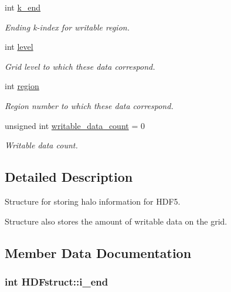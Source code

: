 \begin{DoxyCompactItemize}
int \hyperlink{struct_h_d_fstruct_ac04611672d10126bb2ab53dc0a66535f}{k\+\_\+end}
\begin{DoxyCompactList}\small\item\em Ending k-\/index for writable region. \end{DoxyCompactList}\item 
int \hyperlink{struct_h_d_fstruct_aef9143324c08da8bcdce294e37e9ddd3}{level}
\begin{DoxyCompactList}\small\item\em Grid level to which these data correspond. \end{DoxyCompactList}\item 
int \hyperlink{struct_h_d_fstruct_a9a6355bf67ceed24a4f22bc9df6e2400}{region}
\begin{DoxyCompactList}\small\item\em Region number to which these data correspond. \end{DoxyCompactList}\item 
unsigned int \hyperlink{struct_h_d_fstruct_a1a5b120987c361f65c19d906bf66c533}{writable\+\_\+data\+\_\+count} = 0
\begin{DoxyCompactList}\small\item\em Writable data count. \end{DoxyCompactList}\end{DoxyCompactItemize}


\subsection{Detailed Description}
Structure for storing halo information for H\+D\+F5. 

Structure also stores the amount of writable data on the grid. 

\subsection{Member Data Documentation}
\subsubsection[{\texorpdfstring{i\+\_\+end}{i_end}}]{\setlength{\rightskip}{0pt plus 5cm}int H\+D\+Fstruct\+::i\+\_\+end}\hypertarget{struct_h_d_fstruct_aa8ea8df998eefe394f2123aa4eaa80c5}{}\label{struct_h_d_fstruct_aa8ea8df998eefe394f2123aa4eaa80c5}


